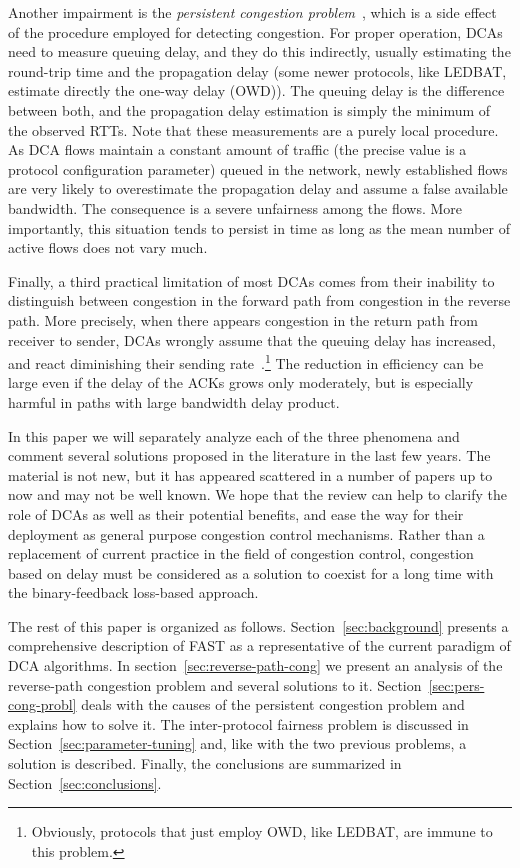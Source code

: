 \documentclass[english,times]{ettauth}
\begin{document}
Another impairment is the \emph{persistent congestion
  problem}~\cite{Wei06,Hengartner00,Rperez10}, which is a side effect of the
procedure employed for detecting congestion. For proper operation, DCAs need
to measure queuing delay, and they do this indirectly, usually estimating the
round-trip time and the propagation delay (some newer protocols, like LEDBAT,
estimate directly the one-way delay (OWD)). The queuing delay is the
difference between both, and the propagation delay estimation is simply the
minimum of the observed RTTs. Note that these measurements are a purely local
procedure. As DCA flows maintain a constant amount of traffic (the precise
value is a protocol configuration parameter) queued in the network, newly
established flows are very likely to overestimate the propagation delay and
assume a false available bandwidth. The consequence is a severe unfairness
among the flows. More importantly, this situation tends to persist in time as
long as the mean number of active flows does not vary much.

Finally, a third practical limitation of most DCAs comes from their inability
to distinguish between congestion in the forward path from congestion in the
reverse path. More precisely, when there appears congestion in the return path
from receiver to sender, DCAs wrongly assume that the queuing delay has
increased, and react diminishing their sending
rate~\cite{Fu03,Chan03,Liu05,Herreria07}.\footnote{Obviously, protocols that
  just employ OWD, like LEDBAT, are immune to this problem.} The reduction in
efficiency can be large even if the delay of the ACKs grows only moderately,
but is especially harmful in paths with large bandwidth  delay
product.

In this paper we will separately analyze each of the three phenomena and
comment several solutions proposed in the literature in the last few
years. The material is not new, but it has appeared scattered in a number of
papers up to now and may not be well known.  We hope that the review can help
to clarify the role of DCAs as well as their potential benefits, and ease the
way for their deployment as general purpose congestion control
mechanisms. Rather than a replacement of current practice in the field of
congestion control, congestion based on delay must be considered as a solution
to coexist for a long time with the binary-feedback loss-based approach.

The rest of this paper is organized as follows. Section~\ref{sec:background}
presents a comprehensive description of FAST as a representative of the
current paradigm of DCA algorithms. In section~\ref{sec:reverse-path-cong} we
present an analysis of the reverse-path congestion problem and several
solutions to it.  Section~\ref{sec:pers-cong-probl} deals with the causes of
the persistent congestion problem and explains how to solve it. The
inter-protocol fairness problem is discussed in
Section~\ref{sec:parameter-tuning} and, like with the two previous problems, a
solution is described. Finally, the conclusions are summarized in
Section~\ref{sec:conclusions}.
\end{document}
